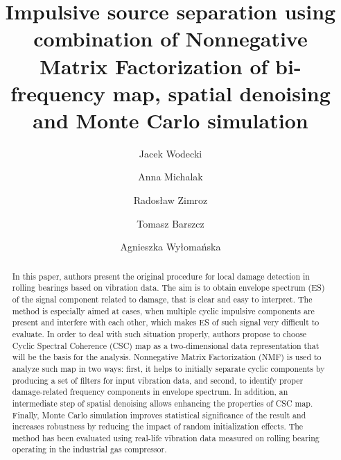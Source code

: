 \documentclass[3p, 12pt]{elsarticle} %
\begin{document}
\begin{frontmatter}

\title{Impulsive source separation using combination of Nonnegative Matrix Factorization of bi-frequency map, spatial denoising and Monte Carlo simulation}

\author[label1]{Jacek Wodecki }
\author[label3]{Anna Michalak}
\author[label1]{Rados{\l}aw Zimroz}
\author[label2]{Tomasz Barszcz}
\author[label3]{Agnieszka Wy{\l}oma{\'n}ska}

\address[label1]{Faculty of Geoengineering, Mining and Geology, Wroclaw University of Science and Technology, Na Grobli 15, 50-421 Wroclaw, Poland
\\\{jacek.wodecki, radoslaw.zimroz\}@pwr.edu.pl\\}
\address[label2]{AGH University of Science and Technology, Krakow, Poland
\\ tbarszcz@agh.edu.pl\\}
\address[label3]{KGHM Cuprum Ltd, Research and Development Centre, Sikorskiego 2-8, 53-659 Wroclaw, Poland
 \{amichalak, awylomanska\}@cuprum.wroc.pl\\}

\begin{abstract}

In this paper, authors present the original procedure for local damage detection in rolling bearings based on vibration data. The aim is to obtain envelope spectrum (ES) of the signal component related to damage, that is clear and easy to interpret. The method is especially aimed at cases, when multiple cyclic impulsive components are present and interfere with each other, which makes ES of such signal very difficult to evaluate. In order to deal with such situation properly, authors propose to choose Cyclic Spectral Coherence (CSC) map as a two-dimensional data representation that will be the basis for the analysis. Nonnegative Matrix Factorization (NMF) is used to analyze such map in two ways: first, it helps to initially separate cyclic components by producing a set of filters for input vibration data, and second, to identify proper damage-related frequency components in envelope spectrum. In addition, an intermediate step of spatial denoising allows enhancing the properties of CSC map. Finally, Monte Carlo simulation improves statistical significance of the result and increases robustness by reducing the impact of random initialization effects. The method has been evaluated using real-life vibration data measured on rolling bearing operating in the industrial gas compressor.
\end{abstract}


\end{frontmatter}
\end{document}
